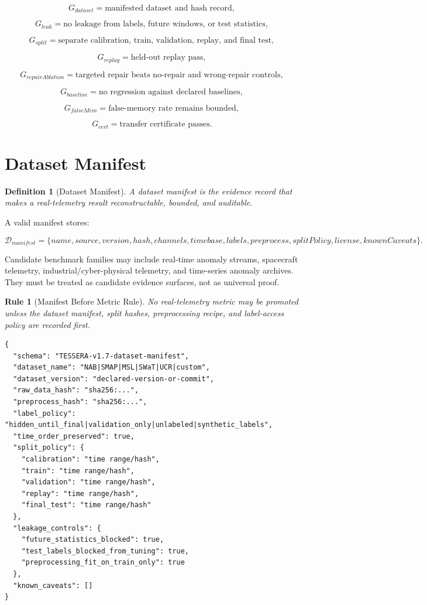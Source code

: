 \documentclass[12pt]{article}
\newtheorem{definition}{Definition}
\newtheorem{rulebox}{Rule}
\begin{document}
\[
G_{dataset}=\text{manifested dataset and hash record},
\]

\[
G_{leak}=\text{no leakage from labels, future windows, or test statistics},
\]

\[
G_{split}=\text{separate calibration, train, validation, replay, and final test},
\]

\[
G_{replay}=\text{held-out replay pass},
\]

\[
G_{repairAblation}=\text{targeted repair beats no-repair and wrong-repair controls},
\]

\[
G_{baseline}=\text{no regression against declared baselines},
\]

\[
G_{falseMem}=\text{false-memory rate remains bounded},
\]

\[
G_{cert}=\text{transfer certificate passes}.
\]

\section{Dataset Manifest}

\begin{definition}[Dataset Manifest]
A dataset manifest is the evidence record that makes a real-telemetry result
reconstructable, bounded, and auditable.
\end{definition}

A valid manifest stores:

\[
\mathcal{D}_{manifest}=\{name,source,version,hash,channels,timebase,labels,
preprocess,splitPolicy,license,knownCaveats\}.
\]

Candidate benchmark families may include real-time anomaly streams, spacecraft
telemetry, industrial/cyber-physical telemetry, and time-series anomaly archives.
They must be treated as candidate evidence surfaces, not as universal proof.

\begin{rulebox}[Manifest Before Metric Rule]
No real-telemetry metric may be promoted unless the dataset manifest, split
hashes, preprocessing recipe, and label-access policy are recorded first.
\end{rulebox}

\begin{lstlisting}
{
  "schema": "TESSERA-v1.7-dataset-manifest",
  "dataset_name": "NAB|SMAP|MSL|SWaT|UCR|custom",
  "dataset_version": "declared-version-or-commit",
  "raw_data_hash": "sha256:...",
  "preprocess_hash": "sha256:...",
  "label_policy": "hidden_until_final|validation_only|unlabeled|synthetic_labels",
  "time_order_preserved": true,
  "split_policy": {
    "calibration": "time range/hash",
    "train": "time range/hash",
    "validation": "time range/hash",
    "replay": "time range/hash",
    "final_test": "time range/hash"
  },
  "leakage_controls": {
    "future_statistics_blocked": true,
    "test_labels_blocked_from_tuning": true,
    "preprocessing_fit_on_train_only": true
  },
  "known_caveats": []
}
\end{lstlisting}
\end{document}
